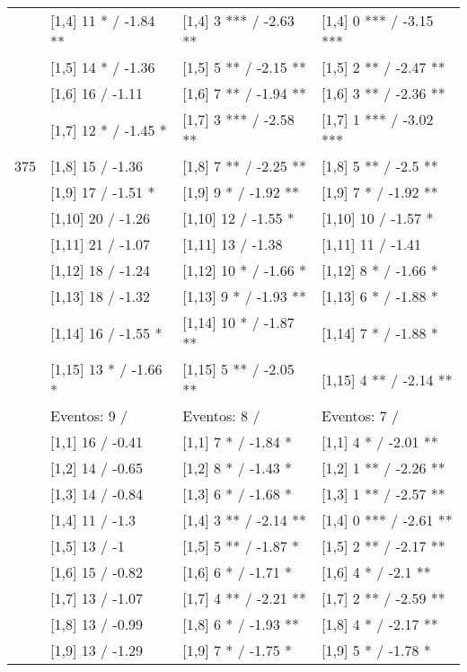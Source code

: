 \begin{table}
\begin{tabular}[t]{llll}
\addlinespace
 & {}[1,4] 11 * / -1.84 ** & {}[1,4] 3 *** / -2.63 ** & {}[1,4] 0 *** / -3.15 ***\\
 & {}[1,5] 14 * / -1.36 & {}[1,5] 5 ** / -2.15 ** & {}[1,5] 2 ** / -2.47 **\\
 & {}[1,6] 16  / -1.11 & {}[1,6] 7 ** / -1.94 ** & {}[1,6] 3 ** / -2.36 **\\
 & {}[1,7] 12 * / -1.45 * & {}[1,7] 3 *** / -2.58 ** & {}[1,7] 1 *** / -3.02 ***\\
375 & {}[1,8] 15  / -1.36 & {}[1,8] 7 ** / -2.25 ** & {}[1,8] 5 ** / -2.5 **\\
\addlinespace
 & {}[1,9] 17  / -1.51 * & {}[1,9] 9 * / -1.92 ** & {}[1,9] 7 * / -1.92 **\\
 & {}[1,10] 20  / -1.26 & {}[1,10] 12  / -1.55 * & {}[1,10] 10  / -1.57 *\\
 & {}[1,11] 21  / -1.07 & {}[1,11] 13  / -1.38 & {}[1,11] 11  / -1.41\\
 & {}[1,12] 18  / -1.24 & {}[1,12] 10 * / -1.66 * & {}[1,12] 8 * / -1.66 *\\
 & {}[1,13] 18  / -1.32 & {}[1,13] 9 * / -1.93 ** & {}[1,13] 6 * / -1.88 *\\
\addlinespace
 & {}[1,14] 16  / -1.55 * & {}[1,14] 10 * / -1.87 ** & {}[1,14] 7 * / -1.88 *\\
 & {}[1,15] 13 * / -1.66 * & {}[1,15] 5 ** / -2.05 ** & {}[1,15] 4 ** / -2.14 **\\
 & Eventos:  9 / & Eventos:  8 / & Eventos:  7 /\\
 & {}[1,1] 16  / -0.41 & {}[1,1] 7 * / -1.84 * & {}[1,1] 4 * / -2.01 **\\
 & {}[1,2] 14  / -0.65 & {}[1,2] 8 * / -1.43 * & {}[1,2] 1 ** / -2.26 **\\
\addlinespace
 & {}[1,3] 14  / -0.84 & {}[1,3] 6 * / -1.68 * & {}[1,3] 1 ** / -2.57 **\\
 & {}[1,4] 11  / -1.3 & {}[1,4] 3 ** / -2.14 ** & {}[1,4] 0 *** / -2.61 **\\
 & {}[1,5] 13  / -1 & {}[1,5] 5 ** / -1.87 * & {}[1,5] 2 ** / -2.17 **\\
 & {}[1,6] 15  / -0.82 & {}[1,6] 6 * / -1.71 * & {}[1,6] 4 * / -2.1 **\\
 & {}[1,7] 13  / -1.07 & {}[1,7] 4 ** / -2.21 ** & {}[1,7] 2 ** / -2.59 **\\
\addlinespace
500 & {}[1,8] 13  / -0.99 & {}[1,8] 6 * / -1.93 ** & {}[1,8] 4 * / -2.17 **\\
 & {}[1,9] 13  / -1.29 & {}[1,9] 7 * / -1.75 * & {}[1,9] 5 * / -1.78 *\\

\end{tabular}
\end{table}
